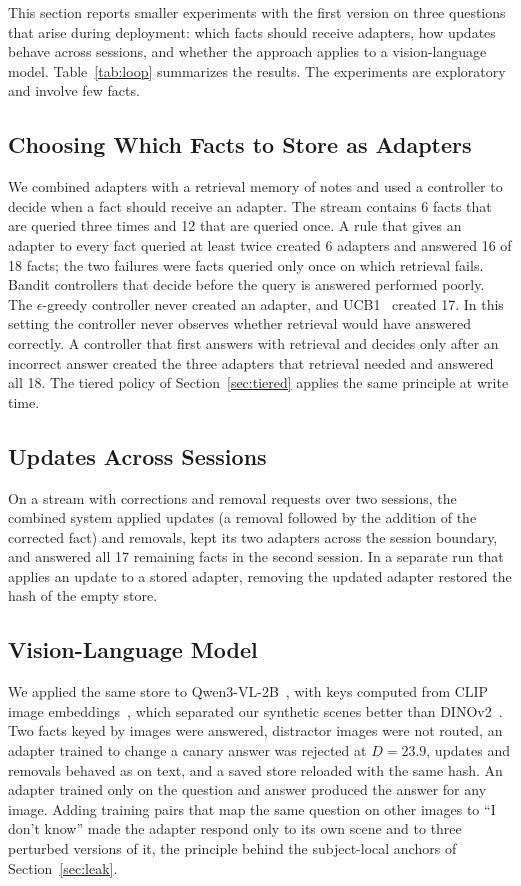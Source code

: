 \documentclass[journal,10pt]{IEEEtran}
\begin{document}
This section reports smaller experiments with the first version on three questions that
arise during deployment: which facts should receive adapters, how updates behave across
sessions, and whether the approach applies to a vision-language model.
Table~\ref{tab:loop} summarizes the results. The experiments are exploratory and
involve few facts.



\subsection{Choosing Which Facts to Store as Adapters}
We combined adapters with a retrieval memory of notes and used a controller to decide
when a fact should receive an adapter. The stream contains 6 facts that are queried three
times and 12 that are queried once. A rule that gives an adapter to every fact queried at
least twice created 6 adapters and answered 16 of 18 facts; the two failures were facts
queried only once on which retrieval fails. Bandit controllers that decide before the
query is answered performed poorly. The $\epsilon$-greedy controller never created an
adapter, and UCB1~\cite{auer2002ucb} created 17. In this setting the controller never
observes whether retrieval would have answered correctly. A controller that first
answers with retrieval and decides only after an incorrect answer created the three
adapters that retrieval needed and answered all 18. The tiered policy of
Section~\ref{sec:tiered} applies the same principle at write time.

\subsection{Updates Across Sessions}
On a stream with corrections and removal requests over two sessions, the combined
system applied updates (a removal followed by the addition of the corrected fact) and
removals, kept its two adapters across the session boundary, and answered all 17
remaining facts in the second session. In a separate run that applies an update to a
stored adapter, removing the updated adapter restored the hash of the empty store.

\subsection{Vision-Language Model}
We applied the same store to Qwen3-VL-2B~\cite{qwen2025qwen3vl}, with keys computed
from CLIP image embeddings~\cite{radford2021clip}, which separated our synthetic scenes
better than DINOv2~\cite{oquab2024dinov2}. Two facts keyed by images were answered,
distractor images were not routed, an adapter trained to change a canary answer was
rejected at $D=23.9$, updates and removals behaved as on text, and a saved store
reloaded with the same hash. An adapter trained only on the question and answer produced
the answer for any image. Adding training pairs that map the same question on other
images to ``I don't know'' made the adapter respond only to its own scene and to three
perturbed versions of it, the principle behind the subject-local anchors of
Section~\ref{sec:leak}.
\end{document}
